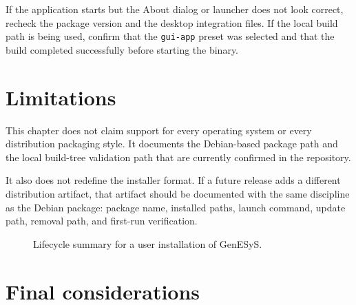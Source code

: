 If the application starts but the About dialog or launcher does not look
correct, recheck the package version and the desktop integration files. If the
local build path is being used, confirm that the \texttt{gui-app} preset was
selected and that the build completed successfully before starting the binary.

\section{Limitations}
\label{sec:user-installation-limitations}

This chapter does not claim support for every operating system or every
distribution packaging style. It documents the Debian-based package path and
the local build-tree validation path that are currently confirmed in the
repository.

It also does not redefine the installer format. If a future release adds a
different distribution artifact, that artifact should be documented with the
same discipline as the Debian package: package name, installed paths, launch
command, update path, removal path, and first-run verification.

\begin{figure}[htbp]
    \centering



    \caption{Lifecycle summary for a user installation of GenESyS.}
    \label{fig:user-installation-structure-summary}
\end{figure}

\section{Final considerations}
\label{sec:user-installation-final-considerations}

